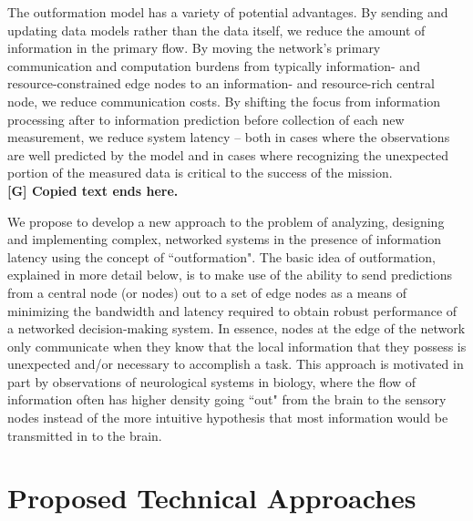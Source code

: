 \documentclass[12pt,letterpaper]{article}
\begin{document}
The outformation model has a variety of potential advantages. By sending and updating data models rather than the data itself, we reduce the amount of information in the primary flow. By moving the network’s primary communication and computation burdens from typically information- and resource-constrained edge nodes to an information- and resource-rich central node, we reduce communication costs. By shifting the focus from information processing after to information prediction before collection of each new measurement, we reduce system latency – both in cases where the observations are well predicted by the model and in cases where recognizing the unexpected portion of the measured data is critical to the success of the mission. \\
\textbf{[G] Copied text ends here.}


We propose to develop a new approach to the problem of analyzing, designing and implementing complex, networked systems in the presence of information latency using the concept of ``outformation".  The basic idea of outformation, explained in more detail below, is to make use of the ability to send predictions from a central node (or nodes) out to a set of edge nodes as a means of minimizing the bandwidth and latency required to obtain robust performance of a networked decision-making system.  In essence, nodes at the edge of the network only communicate when they know that the local information that they possess is unexpected and/or necessary to accomplish a task.  This approach is motivated in part by observations of neurological systems in biology, where the flow of information often has higher density going ``out" from the brain to the sensory nodes instead of the more intuitive hypothesis that most information would be transmitted in to the brain.


\section{Proposed Technical Approaches}
\end{document}
